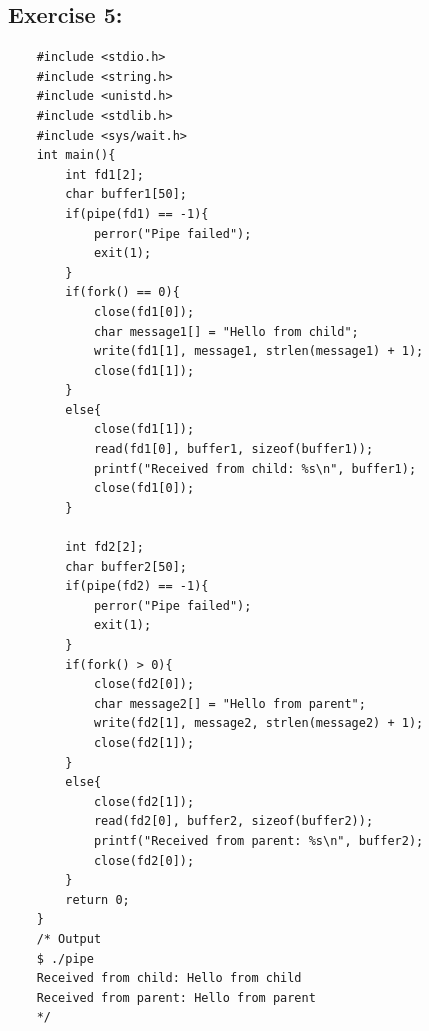 \documentclass{article}
\begin{document}
\subsection{Exercise 5:}
\begin{verbatim}
    #include <stdio.h>
    #include <string.h>
    #include <unistd.h>
    #include <stdlib.h>
    #include <sys/wait.h>
    int main(){
        int fd1[2];
        char buffer1[50];
        if(pipe(fd1) == -1){
            perror("Pipe failed");
            exit(1);
        }
        if(fork() == 0){
            close(fd1[0]);
            char message1[] = "Hello from child";
            write(fd1[1], message1, strlen(message1) + 1);
            close(fd1[1]);
        }
        else{
            close(fd1[1]);
            read(fd1[0], buffer1, sizeof(buffer1));
            printf("Received from child: %s\n", buffer1);
            close(fd1[0]);
        }
    
        int fd2[2];
        char buffer2[50];
        if(pipe(fd2) == -1){
            perror("Pipe failed");
            exit(1);
        }
        if(fork() > 0){
            close(fd2[0]);
            char message2[] = "Hello from parent";
            write(fd2[1], message2, strlen(message2) + 1);
            close(fd2[1]);
        }
        else{
            close(fd2[1]);
            read(fd2[0], buffer2, sizeof(buffer2));
            printf("Received from parent: %s\n", buffer2);
            close(fd2[0]);
        }
        return 0;
    }
    /* Output
    $ ./pipe
    Received from child: Hello from child
    Received from parent: Hello from parent
    */
\end{verbatim}
\end{document}
